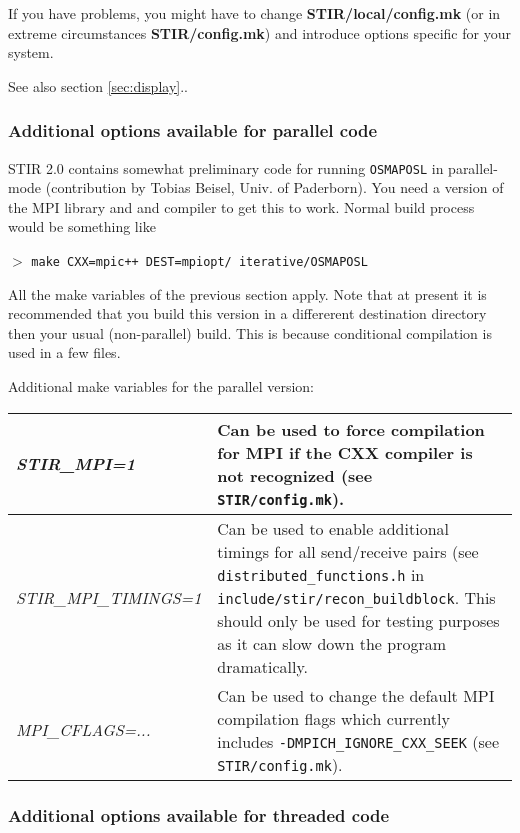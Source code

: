 \documentclass{article}
\newcommand{\cmdline}[1]{\par \noindent $>$ \texttt{#1}\par}
\begin{document}
If you have problems, you might have to change \textbf{STIR/local/config.mk}
(or in extreme circumstances \textbf{STIR/config.mk}) and introduce options 
specific for your system.


See also section \ref{sec:display}..

\subsubsection{
Additional options available for parallel code}

STIR 2.0 contains somewhat preliminary code for running \texttt{OSMAPOSL} in parallel-mode
(contribution by Tobias Beisel, Univ. of Paderborn). You need a version of the MPI library and
and compiler to get this to work. Normal build process would be something like

\cmdline{make CXX=mpic++ DEST=mpiopt/ iterative/OSMAPOSL}

All the make variables of the previous section apply. Note that at present it is 
recommended that you build this version in a differerent destination directory then
your usual (non-parallel) build. This is because conditional compilation is used
in a few files.

Additional make variables for the parallel version:

\begin{longtable}{|p{\MakeTableFirstCol}|p{\MakeTableSecondCol}|}
\hline
{\raggedright \textit{STIR\_MPI=1}} & 
{\raggedright
Can be used to force compilation for MPI if the CXX compiler is not recognized (see 
\texttt{STIR/config.mk}).
} \\
\hline
{\raggedright \textit{STIR\_MPI\_TIMINGS=1}} & 
{\raggedright
Can be used to enable additional timings for all send/receive pairs 
(see \texttt{distributed\_functions.h} in \texttt{include/stir/recon\_buildblock}. 
This should only be used for testing purposes as it can slow down
the program dramatically.
} \\
\hline
{\raggedright
\textit{MPI\_CFLAGS=...}} & 
{\raggedright
Can be used to change the default MPI compilation flags which currently includes
\texttt{-DMPICH\_IGNORE\_CXX\_SEEK} (see 
\texttt{STIR/config.mk}).
} \\
\hline
\end{longtable}

\subsubsection{
Additional options available for threaded code}
\end{document}
